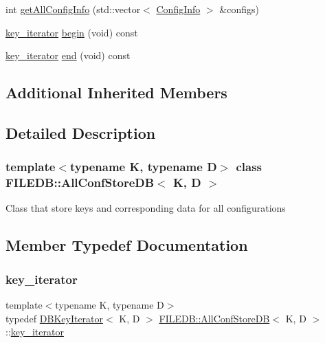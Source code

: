 \begin{DoxyCompactItemize}
int \mbox{\hyperlink{classFILEDB_1_1AllConfStoreDB_aeb8e6daf1a1f9b7a19899cf7db365632}{get\+All\+Config\+Info}} (std\+::vector$<$ \mbox{\hyperlink{classFILEDB_1_1ConfigInfo}{Config\+Info}} $>$ \&configs)
\item 
\mbox{\hyperlink{classFILEDB_1_1AllConfStoreDB_a2ce8981ca7049ed0c2c6e438873a9c1b}{key\+\_\+iterator}} \mbox{\hyperlink{classFILEDB_1_1AllConfStoreDB_a7bb7f812d80471897860af5692eb5bd2}{begin}} (void) const
\item 
\mbox{\hyperlink{classFILEDB_1_1AllConfStoreDB_a2ce8981ca7049ed0c2c6e438873a9c1b}{key\+\_\+iterator}} \mbox{\hyperlink{classFILEDB_1_1AllConfStoreDB_a213c914b326e7769411e305ceb375b1d}{end}} (void) const
\end{DoxyCompactItemize}
\subsection*{Additional Inherited Members}


\subsection{Detailed Description}
\subsubsection*{template$<$typename K, typename D$>$\newline
class F\+I\+L\+E\+D\+B\+::\+All\+Conf\+Store\+D\+B$<$ K, D $>$}

Class that store keys and corresponding data for all configurations 

\subsection{Member Typedef Documentation}
\mbox{\label{classFILEDB_1_1AllConfStoreDB_a2ce8981ca7049ed0c2c6e438873a9c1b}} 
\subsubsection{\texorpdfstring{key\_iterator}{key\_iterator}\hspace{0.1cm}{\footnotesize\ttfamily [1/2]}}
{\footnotesize\ttfamily template$<$typename K, typename D$>$ \\
typedef \mbox{\hyperlink{classFILEDB_1_1DBKeyIterator}{D\+B\+Key\+Iterator}}$<$ K, D $>$ \mbox{\hyperlink{classFILEDB_1_1AllConfStoreDB}{F\+I\+L\+E\+D\+B\+::\+All\+Conf\+Store\+DB}}$<$ K, D $>$\+::\mbox{\hyperlink{classFILEDB_1_1AllConfStoreDB_a2ce8981ca7049ed0c2c6e438873a9c1b}{key\+\_\+iterator}}}

